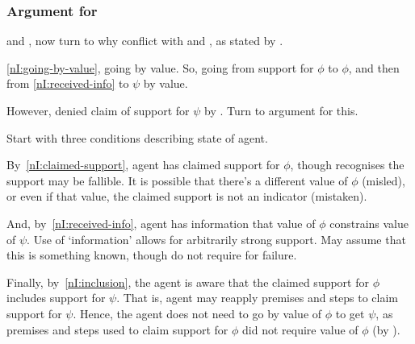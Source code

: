 \subsubsection{Argument for \nI{}}
\label{sec:argument-ni}

\begin{note}[Review of \nI{}]
  \incl{} and \RBV{}, now turn to why conflict with \incl{} and \RBV{}, as stated by \nI{}.

  \ref{nI:going-by-value}, going by value.
  So, going from support for \(\phi\) to \(\phi\), and then from \ref{nI:received-info} to \(\psi\) by value.

  However, denied claim of support for \(\psi\) by \incl{}.
  Turn to argument for this.
\end{note}

\begin{note}
  Start with three conditions describing state of agent.

  By~\ref{nI:claimed-support}, agent has claimed support for \(\phi\), though recognises the support may be fallible.
  It is possible that there's a different value of \(\phi\) (misled), or even if that value, the claimed support is not an indicator (mistaken).

  And, by~\ref{nI:received-info}, agent has information that value of \(\phi\) constrains value of \(\psi\).
  Use of `information' allows for arbitrarily strong support.
  May assume that this is something known, though do not require for failure.

  Finally, by~\ref{nI:inclusion}, the agent is aware that the claimed support for \(\phi\) includes support for \(\psi\).
  That is, agent may reapply premises and steps to claim support for \(\psi\).
  Hence, the agent does not need to go by value of \(\phi\) to get \(\psi\), as premises and steps used to claim support for \(\phi\) did not require value of \(\phi\) (by \eiS{}).
\end{note}


